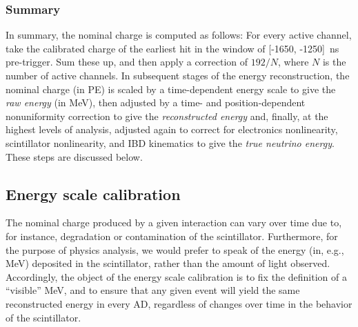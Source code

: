 \documentclass[../thesis.tex]{subfiles}
\begin{document}
\subsubsection{Summary}
\label{sec:reconChargeSummary}

In summary, the nominal charge is computed as follows: For every active channel, take the calibrated charge of the earliest hit in the window of [-1650, -1250]~ns pre-trigger. Sum these up, and then apply a correction of $192/N$, where $N$ is the number of active channels. In subsequent stages of the energy reconstruction, the nominal charge (in PE) is scaled by a time-dependent energy scale to give the \emph{raw energy} (in MeV), then adjusted by a time- and position-dependent nonuniformity correction to give the \emph{reconstructed energy} and, finally, at the highest levels of analysis, adjusted again to correct for electronics nonlinearity, scintillator nonlinearity, and IBD kinematics to give the \emph{true neutrino energy}. These steps are discussed below.

\subsection{Energy scale calibration}
\label{sec:reconEnergyScale}

The nominal charge produced by a given interaction can vary over time due to, for instance, degradation or contamination of the scintillator. Furthermore, for the purpose of physics analysis, we would prefer to speak of the energy (in, e.g., MeV) deposited in the scintillator, rather than the amount of light observed. Accordingly, the object of the energy scale calibration is to fix the definition of a ``visible'' MeV, and to ensure that any given event will yield the same reconstructed energy in every AD, regardless of changes over time in the behavior of the scintillator.
\end{document}
